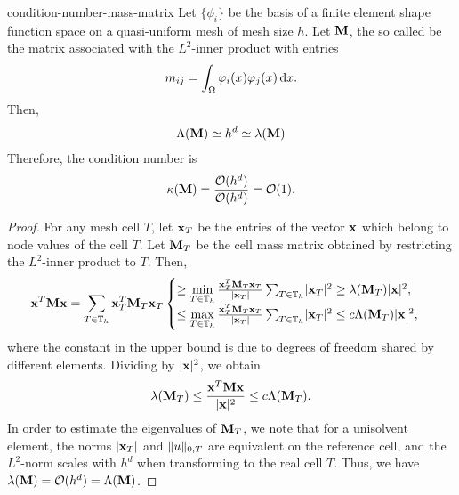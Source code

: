 \begin{Lemma}{condition-number-mass-matrix}
  \label{lemma:itintro:1}
  Let $\{\phi_i\}$ be the basis of a finite element shape function space
  on a quasi-uniform mesh of mesh size $h$. Let
  $\mathbf M$, the so called  be the matrix associated
  with the $L^2$-inner product with entries
  \begin{gather*}
    m_{ij} = \int_\Omega \varphi_i(x) \varphi_j(x) \,\mathrm{d} x.
  \end{gather*}
  Then,
  \begin{gather*}
    \Lambda(\mathbf M) \simeq h^{d} \simeq  \lambda(\mathbf M)
  \end{gather*}
  Therefore, the condition number is
  \begin{gather*}
    \kappa(\mathbf M) = \frac{\mathcal O(h^{d})}{\mathcal O(h^{d})} = {\mathcal O(1)}.
  \end{gather*}
\end{Lemma}

\begin{proof}
  For any mesh cell
  $T$, let $\mathbf x_T$ be the entries of the vector $\mathbf x$ which
  belong to node values of the cell $T$. Let $\mathbf M_T$ be the cell
  mass matrix obtained by restricting the $L^2$-inner product to
  $T$. Then,
  \begin{gather*}
    \mathbf x^T \mathbf M \mathbf x
    = \sum_{T\in\mathbb T_h} \mathbf x^T_T \mathbf M_T \mathbf x_T
    \begin{cases}
    \ge \min\limits_{T\in\mathbb T_h} \frac{\mathbf x^T_T \mathbf M_T \mathbf x_T}{\lvert\mathbf x_T\rvert} \sum_{T\in\mathbb T_h} \lvert\mathbf x_T\rvert^2 \ge \lambda(\mathbf M_T) \lvert\mathbf x\rvert^2,\\
    \le \max\limits_{T\in\mathbb T_h} \frac{\mathbf x^T_T \mathbf M_T \mathbf x_T}{\lvert\mathbf x_T\rvert} \sum_{T\in\mathbb T_h} \lvert\mathbf x_T\rvert^2 \le c \Lambda(\mathbf M_T) \lvert\mathbf x\rvert^2,
    \end{cases}
  \end{gather*}
  where the constant in the upper bound is due to degrees of freedom
  shared by different elements. Dividing by $\lvert\mathbf x\rvert^2$, we
  obtain
  \begin{gather}
    \lambda(\mathbf M_T) \le \frac{\mathbf x^T \mathbf M \mathbf x}{\lvert\mathbf x\rvert^2} \le c \Lambda(\mathbf M_T).
  \end{gather}
  In order to estimate the eigenvalues of $\mathbf M_T$, we note that for
  a unisolvent element, the norms $\lvert\mathbf x_T\rvert$ and $\lVert u\rVert_{0,T}$ are
  equivalent on the reference cell, and the $L^2$-norm scales with
  $h^d$ when transforming to the real cell $T$. Thus, we have
  $\lambda(\mathbf M) = \mathcal O(h^{d}) = \Lambda(\mathbf M)$.
\end{proof}

